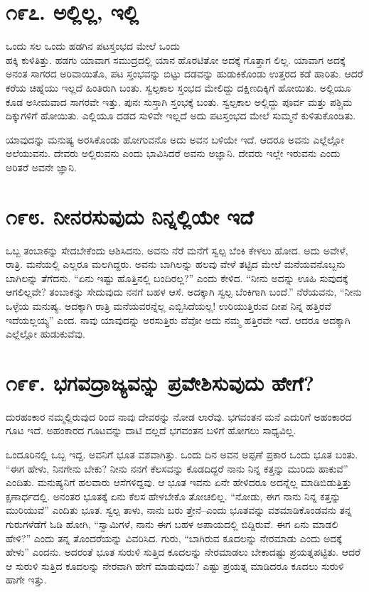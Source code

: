 \section{\num{೧೯೭. } ಅಲ್ಲಿಲ್ಲ, ಇಲ್ಲಿ}

ಒಂದು ಸಲ ಒಂದು ಹಡಗಿನ ಪಟಸ್ತಂಭದ ಮೇಲೆ ಒಂದು\\ಹಕ್ಕಿ ಕುಳಿತಿತ್ತು. ಹಡಗು ಯಾವಾಗ ಸಮುದ್ರದಲ್ಲಿ ಯಾನ ಹೊರಟಿತೋ ಅದಕ್ಕೆ ಗೊತ್ತಾಗ ಲಿಲ್ಲ. ಯಾವಾಗ ಅದಕ್ಕೆ ಅನಂತ ಸಾಗರದ ಅರಿವಾಯಿತೊ, ಪಟ ಸ್ತಂಭವನ್ನು ಬಿಟ್ಟು ದಡವನ್ನು ಹುಡುಕಿಕೊಂಡು ಉತ್ತರದ ಕಡೆ ಹಾರಿತು. ಆದರೆ ಕರೆಯ ಚಿಹ್ನೆಯು ಇಲ್ಲದೆ ಹಿಂತಿರುಗಿ ಬಂತು. ಸ್ವಲ್ಪಕಾಲ ಸ್ತಂಭದ ಮೇಲಿದ್ದು ದಕ್ಷಿಣದಿಕ್ಕಿಗೆ ಹೋಯಿತು. ಅಲ್ಲಿಯೂ ಕೂಡ ಅಸೀಮವಾದ ಸಾಗರವೇ ಇತ್ತು. ಪುನಃ ಸುಸ್ತಾಗಿ ಸ್ತಂಭಕ್ಕೆ ಬಂತು. ಸ್ವಲ್ಪಕಾಲ ಅಲ್ಲಿದ್ದು ಪೂರ್ವ ಮತ್ತು ಪಶ್ಚಿಮ ದಿಕ್ಕುಗಳಿಗೆ ಹೋಯಿತು. ಎಲ್ಲಿಯೂ ದಡದ ಸುಳಿವೇ ಇಲ್ಲದೆ ಅದು ಪಟಸ್ತಂಭದ ಮೇಲೆ ಸುಮ್ಮನೆ ಕುಳಿತುಕೊಂಡಿತು.

ಯಾವುದನ್ನು ಮನುಷ್ಯ ಅರಸಿಕೊಂಡು ಹೋಗುವನೊ ಅದು ಅವನ ಬಳಿಯೇ ಇದೆ. ಆದರೂ ಅವನು ಎಲ್ಲೆಲ್ಲೋ ಅಲೆಯುವನು. ದೇವರು ಅಲ್ಲಿರುವನು ಎಂದು ಭಾವಿಸಿದರೆ ಅವನು ಅಜ್ಞಾನಿ. ದೇವರು ಇಲ್ಲೇ ಇರುವನು ಎಂದು ಅರಿತರೆ ಅವನೇ ಜ್ಞಾನಿ.


\section{\num{೧೯೮. } ನೀನರಸುವುದು ನಿನ್ನಲ್ಲಿಯೇ ಇದೆ}

ಒಬ್ಬ ತಂಬಾಕನ್ನು ಸೇದಬೇಕೆಂದು ಆಶಿಸಿದನು. ಅವನು ನೆರೆ ಮನೆಗೆ ಸ್ವಲ್ಪ ಬೆಂಕಿ ಕೇಳಲು ಹೋದ. ಅದು ಅವೇಳೆ, ರಾತ್ರಿ. ಮನೆಯಲ್ಲಿ ಎಲ್ಲರೂ ಮಲಗಿದ್ದರು. ಅವನು ಬಾಗಿಲನ್ನು ಹಲವು ವೇಳೆ ತಟ್ಟಿದ ಮೇಲೆ ಮನೆಯವನೊಬ್ಬನು ಬಾಗಿಲನ್ನು ತೆಗೆದನು. “ಏನು ಇಷ್ಟು ಹೊತ್ತಿನಲ್ಲಿ ಬಂದಿರಲ್ಲ?” ಎಂದು ಕೇಳಿದ. “ನೀನು ಅದನ್ನು ಊಹಿ ಸುವುದಕ್ಕೆ ಆಗಲಿಲ್ಲವೇ? ತಂಬಾಕನ್ನು ಸೇದುವುದು ನನಗೆ ಬಹಳ ಆಸೆ. ಅದಕ್ಕಾಗಿ ಸ್ವಲ್ಪ ಬೆಂಕಿಗಾಗಿ ಬಂದೆ.” ನೆರೆಯವನು, “ನೀನು ಒಳ್ಳೆಯ ಮನುಷ್ಯ. ಅದಕ್ಕಾಗಿ ರಾತ್ರಿ ಮನೆಯವರನ್ನೆಲ್ಲ ಎಬ್ಬಿಸಿದೆಯಲ್ಲ! ಉರಿಯುತ್ತಿರುವ ದೀಪ ನಿನ್ನ ಹತ್ತಿರವೆ ಇದೆಯಲ್ಲಯ್ಯ” ಎಂದ. ನಾವು ಯಾವುದನ್ನು ಅರಸುತ್ತಿರು ವೆವೋ ಅದು ನಮ್ಮ ಹತ್ತಿರವೇ ಇದೆ. ಆದರೂ ಅದಕ್ಕಾಗಿ ಎಲ್ಲೆಲ್ಲೋ ಹುಡುಕುವೆವು.


\section{\num{೧೯೯. } ಭಗವದ್ರಾಜ್ಯವನ್ನು ಪ್ರವೇಶಿಸುವುದು ಹೇಗೆ?}

ದುರಹಂಕಾರ ನಮ್ಮಲ್ಲಿರುವುದ ರಿಂದ ನಾವು ದೇವರನ್ನು ನೋಡ ಲಾರೆವು. ಭಗವಂತನ ಮನೆ ಎದುರಿಗೆ ಅಹಂಕಾರದ ಗೂಟ ಇದೆ. ಅಹಂಕಾರದ ಗೂಟವನ್ನು ದಾಟಿ ದಲ್ಲದೆ ಭಗವಂತನ ಬಳಿಗೆ ಹೋಗಲು ಸಾಧ್ಯವಿಲ್ಲ.

ಒಂದೂರಿನಲ್ಲಿ ಒಬ್ಬ ಇದ್ದ. ಅವನಿಗೆ ಭೂತ ವಶವಾಗಿತ್ತು. ಒಂದು ದಿನ ಅವನ ಅಪ್ಪಣೆ ಪ್ರಕಾರ ಒಂದು ಭೂತ ಬಂತು. “ಈಗ ಹೇಳು, ನಿನಗೇನು ಬೇಕು? ನೀನು ನನಗೆ ಕೆಲಸವನ್ನು ಕೊಡದಿದ್ದರೆ ನಾನು ನಿನ್ನ ಕತ್ತನ್ನು ಮುರಿದು ಹಾಕುವೆ” ಎಂದಿತು. ಮನುಷ್ಯನಿಗೆ ಹಲವಾರು ಆಸೆಗಳಿದ್ದವು. ಆ ಭೂತ ಇವನು ಏನೇ ಹೇಳಿದರೂ ಅದನ್ನೆಲ್ಲ ಮಾಡಿಬಿಡುತ್ತಿತ್ತು ಕ್ಷಣಾರ್ಧದಲ್ಲಿ. ಅನಂತರ ಭೂತಕ್ಕೆ ಏನು ಕೆಲಸ ಹೇಳಬೇಕೊ ತೋಚಲಿಲ್ಲ. “ನೋಡು, ಈಗ ನಾನು ನಿನ್ನ ಕತ್ತನ್ನು ಮುರಿಯುವೆ” ಎಂದಿತು ಭೂತ. ಸ್ವಲ್ಪ ತಾಳು, ನಾನು ಬರು ತ್ತೇನೆ–ಎಂದು ಭೂತವನ್ನು ವಶಮಾಡಿಕೊಂಡವನು ತನ್ನ ಗುರುಗಳೆಡೆಗೆ ಓಡಿ ಹೋಗಿ, “ಸ್ವಾಮಿಗಳೆ, ನಾನು ಈಗ ಬಹಳ ಅಪಾಯದಲ್ಲಿ ಬಿದ್ದಿರುವೆ. ಈಗ ಏನು ಮಾಡಲಿ ಹೇಳಿ?” ಎಂದು ತನ್ನ ತೊಂದರೆಯನ್ನು ವಿವರಿಸಿದ. ಗುರು, “ಬಾಗಿರುವ ಕೂದಲನ್ನು ನೇರಮಾಡು ಎಂದು ಅದಕ್ಕೆ ಹೇಳು” ಎಂದನು. ಅದರಂತೆ ಭೂತ ಸುರುಳಿ ಸುತ್ತಿದ ಕೂದಲನ್ನು ನೇರಮಾಡಲು ಬೇಕಾದಷ್ಟು ಪ್ರಯತ್ನಪಟ್ಟಿತು. ಆದರೆ ಆ ಸುರುಳಿ ಸುತ್ತಿದ ಕೂದಲನ್ನು ನೇರವಾಗಿ ಹೇಗೆ ಮಾಡುವುದು? ಎಷ್ಟು ಪ್ರಯತ್ನ ಮಾಡಿದರೂ ಕೂದಲು ಸುರುಳಿ ಹಾಗೇ ಇತ್ತು.


